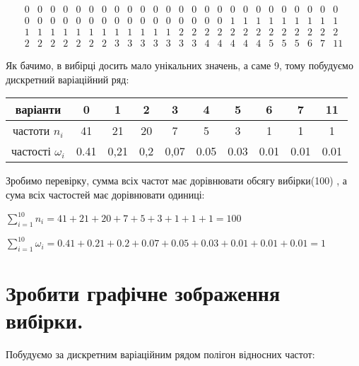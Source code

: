 \documentclass[a5paper, 20pt]{article}
\begin{document}
$$
\begin{matrix}
0 & 0 & 0 & 0 & 0 & 0 & 0 & 0 & 0 & 0 & 0 & 0 & 0 & 0 & 0 & 0 & 0 & 0 & 0 & 0 & 0 & 0 & 0 & 0 & 0 \\
0 & 0 & 0 & 0 & 0 & 0 & 0 & 0 & 0 & 0 & 0 & 0 & 0 & 0 & 0 & 0 & 1 & 1 & 1 & 1 & 1 & 1 & 1 & 1 & 1 \\
1 & 1 & 1 & 1 & 1 & 1 & 1 & 1 & 1 & 1 & 1 & 1 & 2 & 2 & 2 & 2 & 2 & 2 & 2 & 2 & 2 & 2 & 2 & 2 & 2 \\
2 & 2 & 2 & 2 & 2 & 2 & 2 & 3 & 3 & 3 & 3 & 3 & 3 & 3 & 4 & 4 & 4 & 4 & 4 & 5 & 5 & 5 & 6 & 7 & 11
\end{matrix}
$$

Як бачимо, в вибірці досить мало унікальних значень, а саме 9, тому побудуємо дискретний варіаційний ряд:


\begin{center}
\begin{tabular}{| c | c | c | c | c | c | c | c | c | c | }
	\hline
	варіанти & 0 & 1 & 2 & 3  & 4 & 5 & 6 & 7 & 11\\ \hline
	частоти $n_i$ & 41 & 21 & 20 & 7 & 5 & 3 & 1 & 1 & 1\\ \hline
	частості $\omega_i$ & 0.41 & 0,21 & 0,2 & 0,07 & 0.05 & 0.03 & 0.01 & 0.01 & 0.01  \\ \hline
\end{tabular}
\end{center}

Зробимо перевірку, сумма всіх частот має дорівнювати обсягу вибірки(100) , а сума всіх частостей має дорівнювати одиниці:

\vspace{3mm}

$\displaystyle{\sum_{i=1}^{10} n_i = 41 + 21 + 20 + 7 + 5 + 3 + 1 + 1 + 1 = 100}$

\vspace{3mm}

$\displaystyle{\sum_{i=1}^{10} \omega_i = 0.41 + 0.21 + 0.2 + 0.07 + 0.05 + 0.03 + 0.01 + 0.01 + 0.01 = 1 }$

\newpage{}

\section{Зробити графічне зображення вибірки.}


Побудуємо за дискретним варіаційним рядом полігон відносних частот:
\end{document}

